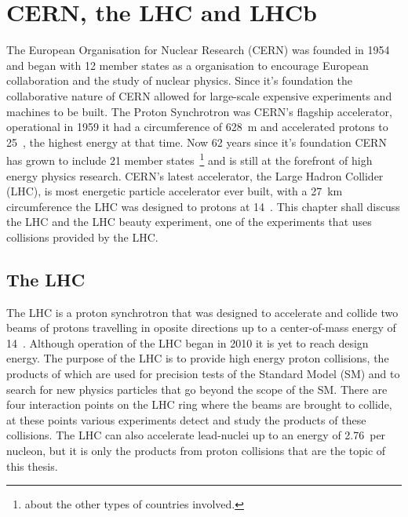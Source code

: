 \chapter{CERN, the LHC and LHCb}
\label{CERN_LHC_LHCb}

The European Organisation for Nuclear Research (CERN) was founded in 1954 and began with 12 member states as a organisation to encourage European collaboration and the study of nuclear physics. Since it's foundation the collaborative nature of CERN allowed for large-scale expensive experiments and machines to be built. The Proton Synchrotron was CERN's flagship accelerator, operational in 1959 it had a circumference of 628~m and accelerated protons to 25~\gev, the highest energy at that time. Now 62 years since it's foundation CERN has grown to include 21 member states~\footnote{about the other types of countries involved.} and is still at the forefront of high energy physics research. CERN’s latest accelerator, the Large Hadron Collider (LHC), is most energetic particle accelerator ever built, with a 27~km circumference the LHC was designed to protons at 14~\tev. This chapter shall discuss the LHC and the LHC beauty experiment, one of the experiments that uses collisions provided by the LHC.

\section{The LHC}
\label{LHC}


The LHC is a proton synchrotron that was designed to accelerate and collide two beams of protons travelling in oposite directions up to a center-of-mass energy of 14~\tev. Although operation of the LHC began in 2010 it is yet to reach design energy. The purpose of the LHC is to provide high energy proton collisions, the products of which are used for precision tests of the Standard Model (SM) and to search for new physics particles that go beyond the scope of the SM. There are four interaction points on the LHC ring where the beams are brought to collide, at these points various experiments detect and study the products of these collisions. The LHC can also accelerate lead-nuclei up to an energy of 2.76~\tev per nucleon, but it is only the products from proton collisions that are the topic of this thesis.

